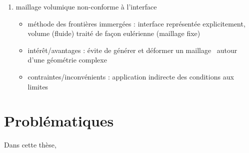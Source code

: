 \begin{enumerate}
	\item maillage volumique non-conforme à l’interface
	\begin{itemize}
		\item méthode des frontières immergées \cite{peskin2002, hovnanian2012, wang2012} : interface représentée explicitement, volume (fluide) traité de façon eulérienne (\ie maillage fixe)
		\item intérêt/avantages : évite de générer et déformer un maillage \troisD\ autour d’une géométrie complexe
		\item contraintes/inconvénients : application indirecte des conditions aux limites
	\end{itemize}
\end{enumerate}


\section{Problématiques}
Dans cette thèse,
